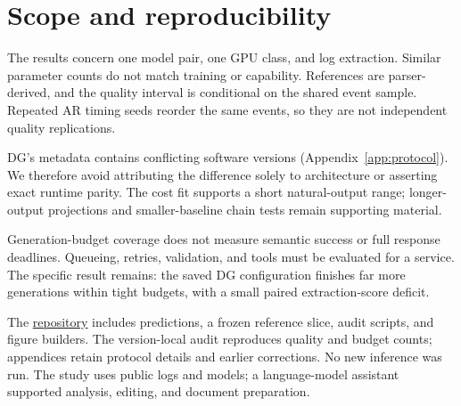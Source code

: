 \section{Scope and reproducibility}
\label{sec:threats}

The results concern one model pair, one GPU class, and log extraction.
Similar parameter counts do not match training or capability.
References are parser-derived, and the quality interval is conditional
on the shared event sample. Repeated AR timing seeds reorder the same
events, so they are not independent quality replications.

DG's metadata contains conflicting software versions
(Appendix~\ref{app:protocol}). We therefore avoid attributing the difference
solely to architecture or asserting exact runtime parity. The cost fit
supports a short natural-output range; longer-output projections and
smaller-baseline chain tests remain supporting material.

Generation-budget coverage does not measure semantic success or full
response deadlines. Queueing, retries, validation, and tools must be
evaluated for a service. The specific result remains: the saved DG
configuration finishes far more generations within tight budgets, with
a small paired extraction-score deficit.

The \href{https://github.com/AlexKay28/DLLM-as-Service}{repository} includes
predictions, a frozen reference slice, audit scripts, and figure builders.
The version-local audit reproduces quality and budget counts; appendices
retain protocol details and earlier corrections. No new inference was run.
The study uses public logs and models; a language-model assistant supported
analysis, editing, and document preparation.
